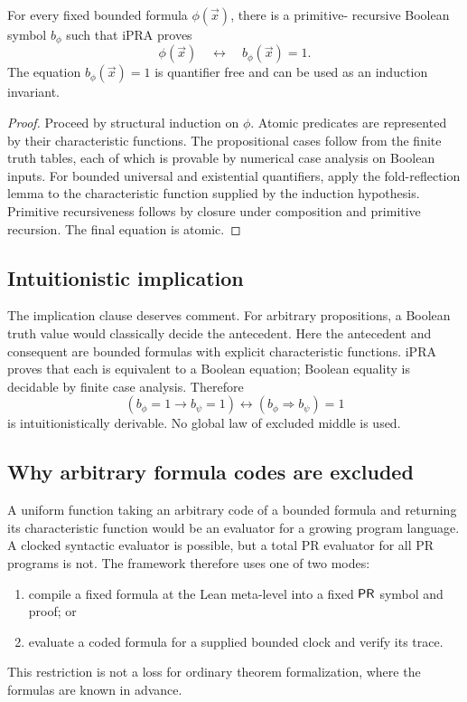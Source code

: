 \begin{theorem}
\label{thm:booleanization}
For every fixed bounded formula \(\phi(\vec x)\), there is a primitive-
recursive Boolean symbol \(b_\phi\) such that iPRA proves
\[
      \phi(\vec x)\quad\leftrightarrow\quad b_\phi(\vec x)=1.
\]
The equation \(b_\phi(\vec x)=1\) is quantifier free and can be used as an
induction invariant.
\end{theorem}

\begin{proof}
Proceed by structural induction on \(\phi\).  Atomic predicates are represented
by their characteristic functions.  The propositional cases follow from the
finite truth tables, each of which is provable by numerical case analysis on
Boolean inputs.  For bounded universal and existential quantifiers, apply the
fold-reflection lemma to the characteristic function supplied by the
induction hypothesis.  Primitive recursiveness follows by closure under
composition and primitive recursion.  The final equation is atomic.
\end{proof}

\subsection{Intuitionistic implication}

The implication clause deserves comment.  For arbitrary propositions, a
Boolean truth value would classically decide the antecedent.  Here the
antecedent and consequent are bounded formulas with explicit characteristic
functions.  iPRA proves that each is equivalent to a Boolean equation; Boolean
equality is decidable by finite case analysis.  Therefore
\[
 (b_\phi=1\to b_\psi=1)
 \leftrightarrow
 (b_\phi\Rightarrow b_\psi)=1
\]
is intuitionistically derivable.  No global law of excluded middle is used.

\subsection{Why arbitrary formula codes are excluded}

A uniform function taking an arbitrary code of a bounded formula and
returning its characteristic function would be an evaluator for a growing
program language.  A clocked syntactic evaluator is possible, but a total PR
evaluator for all PR programs is not.  The framework therefore uses one of two
modes:
\begin{enumerate}
\item compile a fixed formula at the Lean meta-level into a fixed \(\mathsf{PR}\)
symbol and proof; or
\item evaluate a coded formula for a supplied bounded clock and verify its
trace.
\end{enumerate}
This restriction is not a loss for ordinary theorem formalization, where the
formulas are known in advance.

